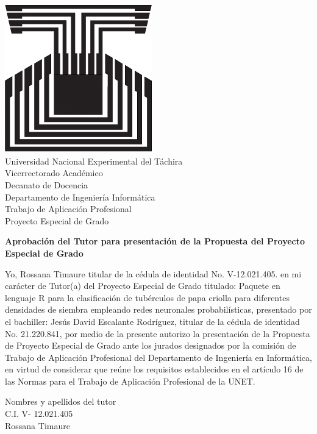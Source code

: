 \chapter*{}
\pagestyle{empty}
\thispagestyle{empty}


\begin{center}
\includegraphics[scale=0.2]{unet.jpg}\\

Universidad Nacional Experimental del T\'achira\\

Vicerrectorado Acad\'emico\\

Decanato de Docencia\\

Departamento de Ingenier\'ia Inform\'atica\\

Trabajo de Aplicaci\'on Profesional\\

Proyecto Especial de Grado\\

\end{center}

\begin{center}
\textbf{Aprobaci\'on del Tutor para presentaci\'on de la Propuesta del Proyecto Especial de Grado}
\end{center}

	Yo,  Rossana Timaure  titular de la c\'edula de identidad No. V-12.021.405.  en mi car\'acter de Tutor(a) del Proyecto Especial de Grado titulado: Paquete en lenguaje R para la clasificaci\'on de tub\'erculos de papa criolla para diferentes densidades de siembra empleando redes neuronales probabil\'isticas, presentado por el bachiller: Jes\'us David Escalante Rodr\'iguez, titular de la c\'edula de identidad No. 21.220.841, por medio de la presente autorizo la presentaci\'on de la Propuesta de Proyecto Especial de Grado ante los jurados designados por la comisi\'on de Trabajo de Aplicaci\'on Profesional del Departamento de Ingenier\'ia en Inform\'atica, en virtud de considerar que re\'une los requisitos establecidos en el art\'iculo 16 de las Normas para el Trabajo de Aplicaci\'on Profesional de la UNET.\\
	
	
	\begin{center}
	Nombres y apellidos del tutor\\
	
	C.I. V- 12.021.405\\
Rossana Timaure\\
	\end{center}